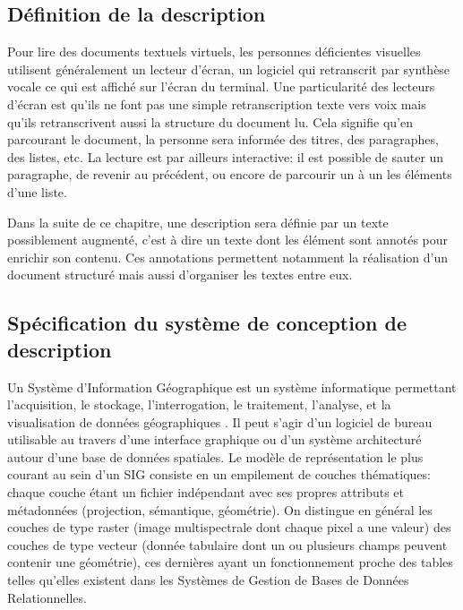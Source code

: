 \subsection{Définition de la description}

Pour lire des documents textuels virtuels, les personnes déficientes visuelles utilisent généralement un lecteur d’écran, un logiciel qui retranscrit par synthèse vocale ce qui est affiché sur l’écran du terminal. Une particularité des lecteurs d’écran est qu’ils ne font pas une simple retranscription texte vers voix mais qu’ils retranscrivent aussi la structure du document lu. Cela signifie qu’en parcourant le document, la personne sera informée des titres, des paragraphes, des listes, etc. La lecture est par ailleurs interactive: il est possible de sauter un paragraphe, de revenir au précédent, ou encore de parcourir un à un les éléments d’une liste.

\newpar{}

Dans la suite de ce chapitre, une description sera définie par un texte possiblement augmenté, c’est à dire un texte dont les élément sont annotés pour enrichir son contenu. Ces annotations permettent notamment la réalisation d’un document structuré mais aussi d’organiser les textes entre eux.

\subsection{Spécification du système de conception de description}

Un Système d’Information Géographique est un système informatique permettant l’acquisition, le stockage, l’interrogation, le traitement, l’analyse, et la visualisation de données géographiques \citep{AschanLeygonie2019}. Il peut s’agir d’un logiciel de bureau utilisable au travers d’une interface graphique ou d’un système architecturé autour d’une base de données spatiales. Le modèle de représentation le plus courant au sein d'un SIG consiste en un empilement de couches thématiques: chaque couche étant un fichier indépendant avec ses propres attributs et métadonnées (projection, sémantique, géométrie). On distingue en général les couches de type raster (image multispectrale dont chaque pixel a une valeur) des couches de type vecteur (donnée tabulaire dont un ou plusieurs champs peuvent contenir une géométrie), ces dernières ayant un fonctionnement proche des tables telles qu’elles existent dans les Systèmes de Gestion de Bases de Données Relationnelles. 

